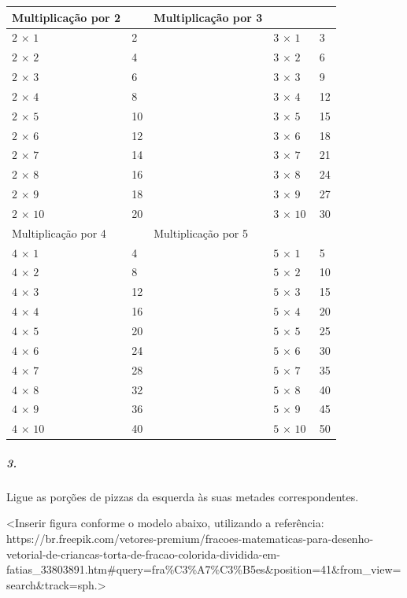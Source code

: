\begin{longtable}[]{@{}lllll@{}}
\toprule
Multiplicação por 2 & & Multiplicação por 3\tabularnewline
\midrule
\endhead
\(2\, \times \, 1\ \) & 2 & & \(3\, \times \, 1\ \) & 3\tabularnewline
\(2\, \times \, 2\ \) & 4 & & \(3\, \times \, 2\ \) & 6\tabularnewline
\(2\, \times \, 3\ \) & 6 & & \(3\, \times \, 3\ \) & 9\tabularnewline
\(2\, \times \, 4\ \) & 8 & & \(3\, \times \, 4\ \) & 12\tabularnewline
\(2\, \times \, 5\ \) & 10 & & \(3\, \times \, 5\ \) & 15\tabularnewline
\(2\, \times \, 6\ \) & 12 & & \(3\, \times \, 6\ \) & 18\tabularnewline
\(2\, \times \, 7\ \) & 14 & & \(3\, \times \, 7\ \) & 21\tabularnewline
\(2\, \times \, 8\ \) & 16 & & \(3\, \times \, 8\ \) & 24\tabularnewline
\(2\, \times \, 9\ \) & 18 & & \(3\, \times \, 9\ \) & 27\tabularnewline
\(2\, \times \, 10\ \) & 20 & & \(3\, \times \, 10\ \) &
30\tabularnewline
Multiplicação por 4 & & Multiplicação por 5\tabularnewline
\(4\, \times \, 1\ \) & 4 & & \(5\, \times \, 1\ \) & 5\tabularnewline
\(4\, \times \, 2\ \) & 8 & & \(5\, \times \, 2\ \) & 10\tabularnewline
\(4\, \times \, 3\ \) & 12 & & \(5\, \times \, 3\ \) & 15\tabularnewline
\(4\, \times \, 4\ \) & 16 & & \(5\, \times \, 4\ \) & 20\tabularnewline
\(4\, \times \, 5\ \) & 20 & & \(5\, \times \, 5\ \) & 25\tabularnewline
\(4\, \times \, 6\ \) & 24 & & \(5\, \times \, 6\ \) & 30\tabularnewline
\(4\, \times \, 7\ \) & 28 & & \(5\, \times \, 7\ \) & 35\tabularnewline
\(4\, \times \, 8\ \) & 32 & & \(5\, \times \, 8\ \) & 40\tabularnewline
\(4\, \times \, 9\ \) & 36 & & \(5\, \times \, 9\ \) & 45\tabularnewline
\(4\, \times \, 10\ \) & 40 & & \(5\, \times \, 10\ \) &
50\tabularnewline
\bottomrule
\end{longtable}

\subparagraph{3.}\label{section-91}

Ligue as porções de pizzas da esquerda às suas metades correspondentes.

\textless{}Inserir figura conforme o modelo abaixo, utilizando a
referência:
https://br.freepik.com/vetores-premium/fracoes-matematicas-para-desenho-vetorial-de-criancas-torta-de-fracao-colorida-dividida-em-fatias\_33803891.htm\#query=fra\%C3\%A7\%C3\%B5es\&position=41\&from\_view=search\&track=sph.\textgreater{}

